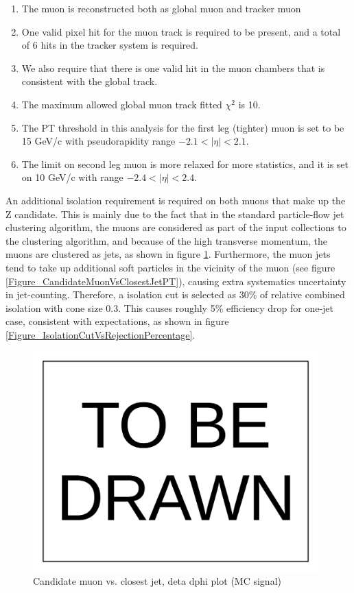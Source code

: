 \documentclass[10pt,a4paper,onecolumn]{	article}
\begin{document}
\begin{enumerate}
\item The muon is reconstructed both as global muon and tracker muon
\item One valid pixel hit for the muon track is required to be present, and a total of 6 hits in the tracker system is required.
\item We also require that there is one valid hit in the muon chambers that is consistent with the global track.
\item The maximum allowed global muon track fitted $\chi^2$ is 10.
\item The PT threshold in this analysis for the first leg (tighter) muon is set to be 15 GeV/c with pseudorapidity range $-2.1 < |\eta| < 2.1$.
\item The limit on second leg muon is more relaxed for more statistics, and it is set on 10 GeV/c with range $-2.4 < |\eta| < 2.4$.
\end{enumerate}

An additional isolation requirement is required on both muons that make up the Z candidate.
This is mainly due to the fact that in the standard particle-flow jet clustering algorithm, the muons are considered as part
of the input collections to the clustering algorithm, and because of the high transverse momentum, the muons are clustered
as jets, as shown in figure \ref{Figure_CandidateMuonVsClosestJetEtaPhi}.  Furthermore, the muon jets tend to take up additional soft particles
in the vicinity of the muon (see figure \ref{Figure_CandidateMuonVsClosestJetPT}), causing extra systematics uncertainty in jet-counting.
Therefore, a isolation cut is selected as 30\% of relative combined isolation with cone size 0.3.  This causes roughly 5\%
efficiency drop for one-jet case, consistent with expectations, as shown in figure \ref{Figure_IsolationCutVsRejectionPercentage}.

\begin{figure}
\includegraphics[width=110mm]{ToBeDrawn.pdf}
\caption{Candidate muon vs. closest jet, deta dphi plot (MC signal)}
\label{Figure_CandidateMuonVsClosestJetEtaPhi}
\end{figure}
\end{document}
